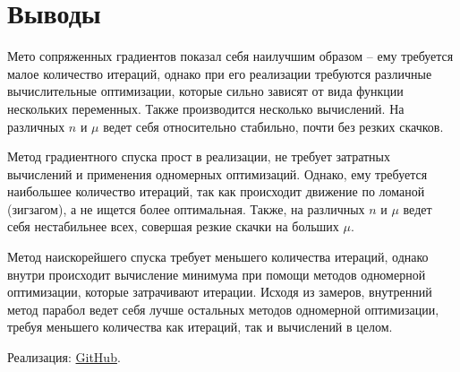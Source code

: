 \documentclass[12pt]{article}
\begin{document}
\section{Выводы}

Мето сопряженных градиентов показал себя наилучшим образом -- ему требуется малое количество итераций, однако при его реализации требуются различные вычислительные оптимизации, которые сильно зависят от вида функции нескольких переменных. Также производится несколько вычислений. На различных $n$ и $\mu$ ведет себя относительно стабильно, почти без резких скачков.

Метод градиентного спуска прост в реализации, не требует затратных вычислений и применения одномерных оптимизаций. Однако, ему требуется наибольшее количество итераций, так как происходит движение по ломаной (зигзагом), а не ищется более оптимальная. Также, на различных $n$ и $\mu$ ведет себя нестабильнее всех, совершая резкие скачки на больших $\mu$.

Метод наискорейшего спуска требует меньшего количества итераций, однако внутри происходит вычисление минимума при помощи методов одномерной оптимизации, которые затрачивают итерации. Исходя из замеров, внутренний метод парабол ведет себя лучше остальных методов одномерной оптимизации, требуя меньшего количества как итераций, так и вычислений в целом. 

Реализация: \href{https://github.com/Mr3zee/ITMO-Optimization-Methods-LAB2-2021/}{GitHub}.
\end{document}
